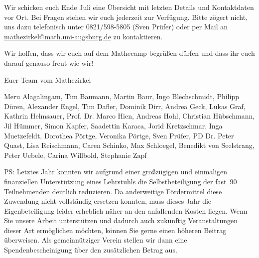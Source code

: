 \documentclass[12pt]{zettel}
\begin{document}
Wir schicken euch Ende Juli eine Übersicht mit
letzten Details und Kontaktdaten vor Ort. Bei Fragen stehen wir euch jederzeit
zur Verfügung. Bitte zögert nicht, uns dazu telefonisch unter 0821/598-5805
(Sven Prüfer) oder per Mail an
\href{mailto:mathezirkel@math.uni-augsburg.de}{\textsf{mathezirkel@math.uni-augsburg.de}} zu kontaktieren.

Wir hoffen, dass wir
euch auf dem Mathecamp begrüßen dürfen und dass
ihr euch darauf genauso freut wie wir!

\vspace{2em}

Euer Team vom Mathezirkel

{\small Meru Alagalingam, Tim Baumann, Martin Baur, Ingo Blechschmidt, Philipp
Düren, Alexander Engel, Tim Dafler, Dominik Dirr, Andrea Geck, Lukas Graf,
Kathrin Helmsauer, Prof. Dr. Marco Hien, Andreas Hohl, Christian Hübschmann,
Jil Hümmer, Simon Kapfer, Saadettin Karaca, Jorid Kretzschmar, Inga
Muetzefeldt, Dorothea Pörtge, Veronika Pörtge, Sven Prüfer, PD Dr. Peter Quast,
Lisa Reischmann, Caren Schinko, Max Schloegel, Benedikt von Seelstrang, Peter
Uebele, Carina Willbold, Stephanie Zapf}

\vfill

PS: Letztes Jahr konnten wir aufgrund einer großzügigen und einmaligen
finanziellen Unterstützung eines Lehrstuhls die Selbstbeteiligung der fast~90
Teilnehmenden deutlich
reduzieren. Da anderweitige Fördermittel diese Zuwendung nicht vollständig
ersetzen konnten, muss dieses Jahr die Eigenbeteiligung leider erheblich näher
an den anfallenden Kosten
liegen. Wenn Sie unsere Arbeit unterstützen
und dadurch auch zukünftig Veranstaltungen dieser Art ermöglichen möchten,
können Sie gerne einen höheren Beitrag überweisen. Als gemeinnütziger Verein
stellen wir dann eine Spendenbescheinigung über den zusätzlichen
Betrag aus.
\end{document}
